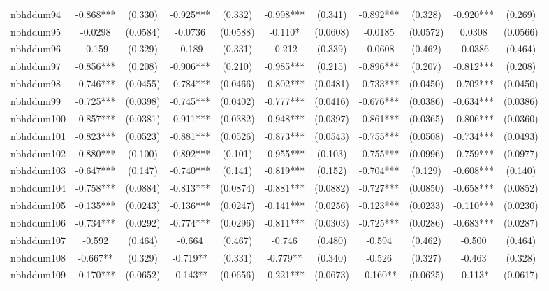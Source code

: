 \documentclass[]{article}
\begin{document}
\begin{tabular}{lcccccccccc}
nbhddum94 & -0.868*** & (0.330) & -0.925*** & (0.332) & -0.998*** & (0.341) & -0.892*** & (0.328) & -0.920*** & (0.269) \\
nbhddum95 & -0.0298 & (0.0584) & -0.0736 & (0.0588) & -0.110* & (0.0608) & -0.0185 & (0.0572) & 0.0308 & (0.0566) \\
nbhddum96 & -0.159 & (0.329) & -0.189 & (0.331) & -0.212 & (0.339) & -0.0608 & (0.462) & -0.0386 & (0.464) \\
nbhddum97 & -0.856*** & (0.208) & -0.906*** & (0.210) & -0.985*** & (0.215) & -0.896*** & (0.207) & -0.812*** & (0.208) \\
nbhddum98 & -0.746*** & (0.0455) & -0.784*** & (0.0466) & -0.802*** & (0.0481) & -0.733*** & (0.0450) & -0.702*** & (0.0450) \\
nbhddum99 & -0.725*** & (0.0398) & -0.745*** & (0.0402) & -0.777*** & (0.0416) & -0.676*** & (0.0386) & -0.634*** & (0.0386) \\
nbhddum100 & -0.857*** & (0.0381) & -0.911*** & (0.0382) & -0.948*** & (0.0397) & -0.861*** & (0.0365) & -0.806*** & (0.0360) \\
nbhddum101 & -0.823*** & (0.0523) & -0.881*** & (0.0526) & -0.873*** & (0.0543) & -0.755*** & (0.0508) & -0.734*** & (0.0493) \\
nbhddum102 & -0.880*** & (0.100) & -0.892*** & (0.101) & -0.955*** & (0.103) & -0.755*** & (0.0996) & -0.759*** & (0.0977) \\
nbhddum103 & -0.647*** & (0.147) & -0.740*** & (0.141) & -0.819*** & (0.152) & -0.704*** & (0.129) & -0.608*** & (0.140) \\
nbhddum104 & -0.758*** & (0.0884) & -0.813*** & (0.0874) & -0.881*** & (0.0882) & -0.727*** & (0.0850) & -0.658*** & (0.0852) \\
nbhddum105 & -0.135*** & (0.0243) & -0.136*** & (0.0247) & -0.141*** & (0.0256) & -0.123*** & (0.0233) & -0.110*** & (0.0230) \\
nbhddum106 & -0.734*** & (0.0292) & -0.774*** & (0.0296) & -0.811*** & (0.0303) & -0.725*** & (0.0286) & -0.683*** & (0.0287) \\
nbhddum107 & -0.592 & (0.464) & -0.664 & (0.467) & -0.746 & (0.480) & -0.594 & (0.462) & -0.500 & (0.464) \\
nbhddum108 & -0.667** & (0.329) & -0.719** & (0.331) & -0.779** & (0.340) & -0.526 & (0.327) & -0.463 & (0.328) \\
nbhddum109 & -0.170*** & (0.0652) & -0.143** & (0.0656) & -0.221*** & (0.0673) & -0.160** & (0.0625) & -0.113* & (0.0617) \\

\end{tabular}
\end{document}
